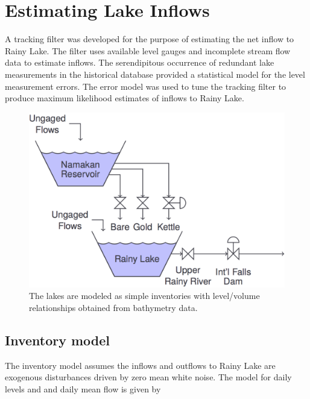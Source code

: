 \documentclass[preprint,times]{elsarticle}
\begin{document}
\section{Estimating Lake Inflows}

A tracking filter was developed for the purpose of estimating the net inflow to Rainy Lake. The filter uses available level gauges and incomplete stream flow data to estimate inflows. The serendipitous occurrence of redundant lake measurements in the historical database provided a statistical model for the level measurement errors. The error model was used to tune the tracking filter to produce maximum likelihood estimates of inflows to Rainy Lake. 

\begin{figure}
\includegraphics[width=\linewidth]{FlowDiagram}
\caption{The lakes are modeled as simple inventories with level/volume relationships obtained from bathymetry data.}\label{figure:5}
\end{figure}

\subsection{Inventory model}

The inventory model assumes the inflows and outflows to Rainy Lake are exogenous disturbances driven by zero mean white noise. The model for daily levels and and daily mean flow is given by
\end{document}

